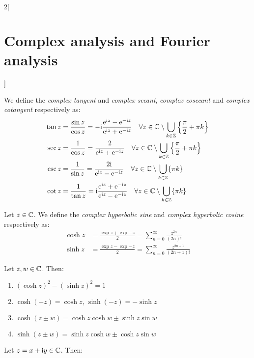 \documentclass[../../../main.tex]{subfiles}
\begin{document}
\begin{multicols}{2}[\section{Complex analysis and Fourier analysis}]
\begin{proposition}
  \end{proposition}
  \begin{definition}
    We define the \emph{complex tangent} and \emph{complex secant}, \emph{complex cosecant} and \emph{complex cotangent} respectively as:
    \begin{align*}
      \tan z & = \frac{\sin z}{\cos z}=-\mathrm{i}\frac{\mathrm{e}^{\mathrm{i} z}-\mathrm{e}^{-\mathrm{i} z}}{\mathrm{e}^{\mathrm{i} z}+\mathrm{e}^{-\mathrm{i} z}}\quad \forall z\in\mathbb{C}\setminus\bigcup_{k\in\mathbb{Z}}\left\{\frac{\pi}{2}+\pi k\right\} \\
      \sec z & = \frac{1}{\cos z}=\frac{2}{\mathrm{e}^{\mathrm{i} z}+\mathrm{e}^{-\mathrm{i} z}}\quad \forall z\in\mathbb{C}\setminus\bigcup_{k\in\mathbb{Z}}\left\{\frac{\pi}{2}+\pi k\right\}                                 \\
      \csc z & = \frac{1}{\sin z}=\frac{2\mathrm{i}}{\mathrm{e}^{\mathrm{i} z}-\mathrm{e}^{-\mathrm{i} z}}\quad\forall z\in\mathbb{C}\setminus\bigcup_{k\in\mathbb{Z}}\{\pi k\}                                                        \\
      \cot z & = \frac{1}{\tan z}=\mathrm{i}\frac{\mathrm{e}^{\mathrm{i} z}+\mathrm{e}^{-\mathrm{i} z}}{\mathrm{e}^{\mathrm{i} z}-\mathrm{e}^{-\mathrm{i} z}}\quad\forall z\in\mathbb{C}\setminus\bigcup_{k\in\mathbb{Z}}\{\pi k\}
    \end{align*}
  \end{definition}
  \begin{definition}
    Let $z\in \mathbb{C}$. We define the \emph{complex hyperbolic sine} and \emph{complex hyperbolic cosine} respectively as:
    \begin{align*}
      \cosh z & =\frac{\exp{z}+\exp{-z}}{2}=\sum_{n=0}^\infty\frac{z^{2n}}{(2n)!}     \\
      \sinh z & =\frac{\exp{z}-\exp{-z}}{2}=\sum_{n=0}^\infty\frac{z^{2n+1}}{(2n+1)!}
    \end{align*}
  \end{definition}
  \begin{proposition}
    Let $z,w\in\mathbb{C}$. Then:
    \begin{enumerate}
      \item ${\left(\cosh z\right)}^2-{\left(\sinh z\right)}^2=1$
      \item $\cosh(-z)=\cosh z$, $\sinh(-z)=-\sinh z$
      \item $\cosh{(z \pm w)} = \cosh z \cosh w \pm \sinh z \sin w$
      \item $\sinh{(z \pm w)} = \sinh z \cosh w \pm \cosh z \sin w$
    \end{enumerate}
  \end{proposition}
  \begin{proposition}
    Let $z=x+\mathrm{i} y\in \mathbb{C}$. Then:

\end{proposition}
\end{multicols}
\end{document}
